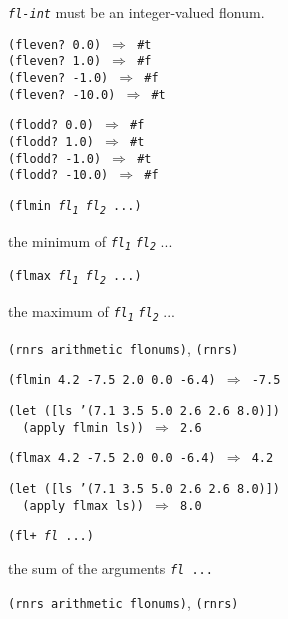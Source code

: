 \texttt{\textit{fl-int}} must be an integer-valued flonum.

\begin{alltt}
(fleven? 0.0) \(\Rightarrow\) \#{}t
(fleven? 1.0) \(\Rightarrow\) \#{}f
(fleven? -1.0) \(\Rightarrow\) \#{}f
(fleven? -10.0) \(\Rightarrow\) \#{}t

(flodd? 0.0) \(\Rightarrow\) \#{}f
(flodd? 1.0) \(\Rightarrow\) \#{}t
(flodd? -1.0) \(\Rightarrow\) \#{}t
(flodd? -10.0) \(\Rightarrow\) \#{}f
\end{alltt}

\begin{description}

\label{objects_s183}\item[procedure] \texttt{(flmin \textit{fl\textsubscript{1}} \textit{fl\textsubscript{2}} ...)}



\item[returns] the minimum of \texttt{\textit{fl\textsubscript{1}}} \texttt{\textit{fl\textsubscript{2}}} ... 

\item[procedure] \texttt{(flmax \textit{fl\textsubscript{1}} \textit{fl\textsubscript{2}} ...)}



\item[returns] the maximum of \texttt{\textit{fl\textsubscript{1}}} \texttt{\textit{fl\textsubscript{2}}} ...

\item[libraries] \texttt{(rnrs arithmetic flonums)}, \texttt{(rnrs)}
\end{description}


\begin{alltt}
(flmin 4.2 -7.5 2.0 0.0 -6.4) \(\Rightarrow\) -7.5

(let ([ls '(7.1 3.5 5.0 2.6 2.6 8.0)])
  (apply flmin ls)) \(\Rightarrow\) 2.6

(flmax 4.2 -7.5 2.0 0.0 -6.4) \(\Rightarrow\) 4.2

(let ([ls '(7.1 3.5 5.0 2.6 2.6 8.0)])
  (apply flmax ls)) \(\Rightarrow\) 8.0
\end{alltt}

\begin{description}

\label{objects_s184}\item[procedure] \texttt{(fl+ \textit{fl} ...)}



\item[returns] the sum of the arguments \texttt{\textit{fl} ...}


\item[libraries] \texttt{(rnrs arithmetic flonums)}, \texttt{(rnrs)}
\end{description}


